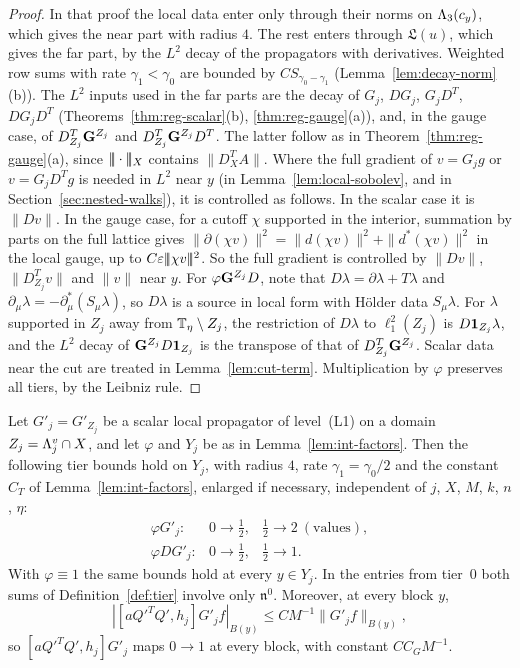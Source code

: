\begin{proof}
In that proof the local data enter only through their norms on $\Lambda_3(c_y)$, which gives the near part with radius $4$. The rest enters through $\mathfrak L(u)$, which gives the far part, by the $L^2$ decay of the propagators with derivatives. Weighted row sums with rate $\gamma_1<\gamma_0$ are bounded by $CS_{\gamma_0-\gamma_1}$ (Lemma~\ref{lem:decay-norm}(b)). The $L^2$ inputs used in the far parts are the decay of $G_j$, $DG_j$, $G_jD^T$, $DG_jD^T$ (Theorems~\ref{thm:reg-scalar}(b), \ref{thm:reg-gauge}(a)), and, in the gauge case, of $D^T_{Z_j}\mathbf G^{Z_j}$ and $D^T_{Z_j}\mathbf G^{Z_j}D^T$. The latter follow as in Theorem~\ref{thm:reg-gauge}(a), since $|\!|\!|\cdot|\!|\!|_X$ contains $\|D^T_XA\|$. Where the full gradient of $v=G_jg$ or $v=G_jD^Tg$ is needed in $L^2$ near $y$ (in Lemma~\ref{lem:local-sobolev}, and in Section~\ref{sec:nested-walks}), it is controlled as follows. In the scalar case it is $\|Dv\|$. In the gauge case, for a cutoff $\chi$ supported in the interior, summation by parts on the full lattice gives $\|\partial(\chi v)\|^2=\|d(\chi v)\|^2+\|d^*(\chi v)\|^2$ in the local gauge, up to $C\varepsilon|\!|\!|\chi v|\!|\!|^2$. So the full gradient is controlled by $\|Dv\|$, $\|D^T_{Z_j}v\|$ and $\|v\|$ near $y$. For $\varphi\mathbf G^{Z_j}D$, note that $D\lambda=\partial\lambda+T\lambda$ and $\partial_\mu\lambda=-\partial^*_\mu(S_\mu\lambda)$, so $D\lambda$ is a source in local form with H\"older data $S_\mu\lambda$. For $\lambda$ supported in $Z_j$ away from $\mathbb T_\eta\setminus Z_j$, the restriction of $D\lambda$ to $\ell^2_1(Z_j)$ is $D\mathbf 1_{Z_j}\lambda$, and the $L^2$ decay of $\mathbf G^{Z_j}D\mathbf 1_{Z_j}$ is the transpose of that of $D^T_{Z_j}\mathbf G^{Z_j}$. Scalar data near the cut are treated in Lemma~\ref{lem:cut-term}. Multiplication by $\varphi$ preserves all tiers, by the Leibniz rule.
\end{proof}

\begin{lemma}\label{lem:endpoint-factors}
Let $G'_j=G'_{Z_j}$ be a scalar local propagator of level~(L1) on a domain $Z_j=\Lambda^v_j\cap X$, and let $\varphi$ and $Y_j$ be as in Lemma~\ref{lem:int-factors}. Then the following tier bounds hold on $Y_j$, with radius $4$, rate $\gamma_1=\gamma_0/2$ and the constant $C_T$ of Lemma~\ref{lem:int-factors}, enlarged if necessary, independent of $j$, $X$, $M$, $k$, $n$, $\eta$:
\[
\begin{array}{lll}
\varphi G'_j: & 0\to\frac12, & \frac12\to2\ (\text{values}),\\
\varphi DG'_j: & 0\to\frac12, & \frac12\to1.
\end{array}
\]
With $\varphi\equiv1$ the same bounds hold at every $y\in Y_j$. In the entries from tier~$0$ both sums of Definition~\ref{def:tier} involve only $\mathfrak n^0$. Moreover, at every block $y$,
\[
|[aQ'^TQ',h_j]G'_jf|_{B(y)}\le CM^{-1}\|G'_jf\|_{B(y)},
\]
so $[aQ'^TQ',h_j]G'_j$ maps $0\to1$ at every block, with constant $CC_GM^{-1}$.
\end{lemma}

